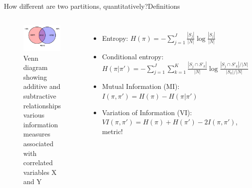 \documentclass[xcolor=dvipsnames]{beamer}
\newcommand{\I}{\mathit{I}}
\newcommand{\VI}{\mathit{VI}}
\begin{document}
\begin{frame}{How different are two partitions, quantitatively?}{Definitions}
  \begin{columns}
  \begin{figure}
    \includegraphics[width=\linewidth]{entropy-relation-diagram}
    \caption{Venn diagram showing additive and subtractive relationships various information measures associated with correlated variables X and Y}
  \end{figure}
  \begin{itemize}
    \item Entropy: $H(\pi) = - \sum^J_{j=1} \frac{|S_j|}{|N|} \log{\frac{|S_j|}{|N|}}$
    \item Conditional entropy: $H(\pi|\pi') = - \sum^J_{j=1} \sum^K_{k=1} \frac{|S_j \cap S'_k|}{|N|} \log{\frac{|S_j \cap S'_k|/|N|}{|S_k|/|N|}}$
    \item Mutual Information (MI): $\I(\pi, \pi') = H(\pi) - H(\pi|\pi')$
    \item Variation of Information (VI): $\VI(\pi, \pi') = H(\pi) + H(\pi') - 2\I(\pi, \pi')$, metric!
  \end{itemize}
  \end{columns}
\end{frame}
\end{document}
